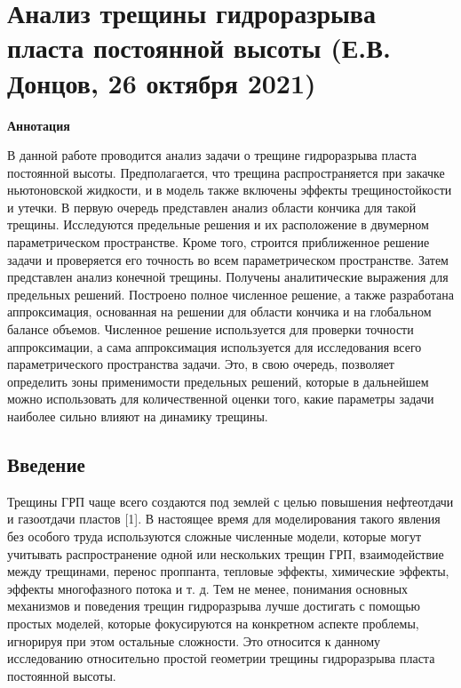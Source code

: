 \documentclass[main.tex]{subfiles}
\begin{document}
\section*{Анализ трещины гидроразрыва пласта постоянной высоты (Е.В. Донцов, 26 октября 2021)}

\textbf{Аннотация}

В данной работе проводится анализ задачи о трещине гидроразрыва пласта постоянной высоты.
Предполагается, что трещина распространяется при закачке ньютоновской жидкости, и в модель также включены эффекты трещиностойкости и утечки.
В первую очередь представлен анализ области кончика для такой трещины.
Исследуются предельные решения и их расположение в двумерном параметрическом пространстве.
Кроме того, строится приближенное решение задачи и проверяется его точность во всем параметрическом пространстве.
Затем представлен анализ конечной трещины.
Получены аналитические выражения для предельных решений.
Построено полное численное решение, а также разработана аппроксимация, основанная на решении для области кончика и на глобальном балансе объемов.
Численное решение используется для проверки точности аппроксимации, а сама аппроксимация используется для исследования всего параметрического пространства задачи.
Это, в свою очередь, позволяет определить зоны применимости предельных решений, которые в дальнейшем можно использовать для количественной оценки того, какие параметры задачи наиболее сильно влияют на динамику трещины.

\subsection{Введение}

Трещины ГРП чаще всего создаются под землей с целью повышения нефтеотдачи и газоотдачи пластов [1].
В настоящее время для моделирования такого явления без особого труда используются сложные численные модели, которые могут учитывать распространение одной или нескольких трещин ГРП, взаимодействие между трещинами, перенос проппанта, тепловые эффекты, химические эффекты, эффекты многофазного потока и т. д.
Тем не менее, понимания основных механизмов и поведения трещин гидроразрыва лучше достигать с помощью простых моделей, которые фокусируются на конкретном аспекте проблемы, игнорируя при этом остальные сложности.
Это относится к данному исследованию относительно простой геометрии трещины гидроразрыва пласта постоянной высоты.
\end{document}
